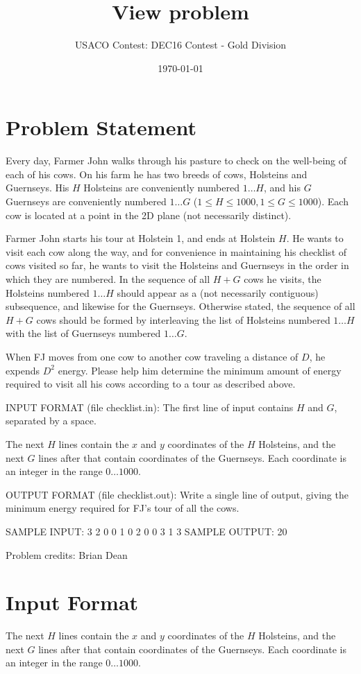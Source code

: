 \documentclass[12pt]{article}
\title{View problem}
\author{USACO Contest: DEC16 Contest - Gold Division}
\date{\today}
\begin{document}
\maketitle

\section*{Problem Statement}

Every day, Farmer John walks through his pasture to check on the well-being of
each of his cows.   On his farm he has two breeds of cows, Holsteins and
Guernseys.  His $H$ Holsteins are conveniently numbered $1 \ldots H$, and his
$G$ Guernseys are conveniently numbered $1 \ldots G$
($1 \leq H \leq 1000, 1 \leq G \leq 1000$).  Each cow is located at a point in
the 2D plane (not necessarily distinct).

Farmer John starts his tour at Holstein 1, and ends at Holstein $H$.  He wants
to visit each cow along the way, and for convenience in maintaining his
checklist of cows visited so far, he wants to visit the Holsteins and Guernseys
in the order in which they are numbered.  In the sequence of all $H+G$ cows he
visits, the Holsteins numbered $1 \ldots H$ should appear as a (not necessarily
contiguous) subsequence, and likewise for the Guernseys. Otherwise stated, the
sequence of all $H+G$ cows should be formed by  interleaving the list of
Holsteins numbered $1 \ldots H$ with the list of Guernseys numbered
$1 \ldots G$.

When FJ moves from one cow to another cow traveling a distance of $D$, he
expends $D^2$ energy.  Please help him determine the minimum amount of energy
required to visit all his cows according to a tour as described above.

INPUT FORMAT (file checklist.in):
The first line of input contains $H$ and $G$, separated by a space.

The next $H$ lines contain the $x$ and $y$ coordinates of the $H$ Holsteins, and
the next $G$ lines after that contain coordinates of the Guernseys.  Each
coordinate is an integer in the range $0 \ldots 1000$.

OUTPUT FORMAT (file checklist.out):
Write a single line of output, giving the minimum energy required for FJ's tour
of all the cows.

SAMPLE INPUT:
3 2
0 0
1 0
2 0
0 3
1 3
SAMPLE OUTPUT: 
20


Problem credits: Brian Dean



\section*{Input Format}
The next $H$ lines contain the $x$ and $y$ coordinates of the $H$ Holsteins, and
the next $G$ lines after that contain coordinates of the Guernseys.  Each
coordinate is an integer in the range $0 \ldots 1000$.
\end{document}
